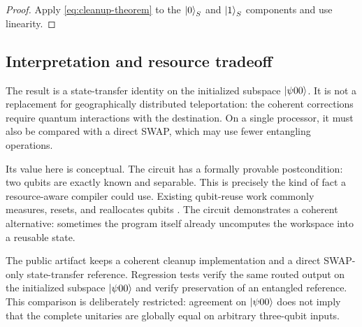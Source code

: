 \begin{proof}
Apply \cref{eq:cleanup-theorem} to the $\ket{0}_S$ and $\ket{1}_S$ components
and use linearity.
\end{proof}

\subsection{Interpretation and resource tradeoff}

The result is a state-transfer identity on the initialized subspace
$\ket{\psi00}$. It is not a replacement for geographically distributed
teleportation: the coherent corrections require quantum interactions with the
destination. On a single processor, it must also be compared with a direct
SWAP, which may use fewer entangling operations.

Its value here is conceptual. The circuit has a formally provable postcondition:
two qubits are exactly known and separable. This is precisely the kind of fact a
resource-aware compiler could use. Existing qubit-reuse work commonly measures,
resets, and reallocates qubits \cite{decross2023reuse}. The circuit demonstrates
a coherent alternative: sometimes the program itself already uncomputes the
workspace into a reusable state.

\begin{claimbox}
The public artifact keeps a coherent cleanup implementation and a direct
SWAP-only state-transfer reference. Regression tests verify the same routed
output on the initialized subspace $\ket{\psi00}$ and verify preservation of an
entangled reference. This comparison is deliberately restricted: agreement on
$\ket{\psi00}$ does not imply that the complete unitaries are globally equal on
arbitrary three-qubit inputs.
\end{claimbox}
